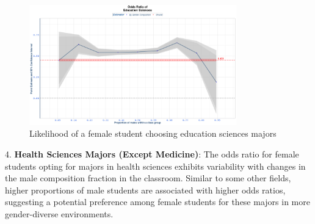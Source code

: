 \begin{figure}[H]
\centering
\includegraphics[width=0.8\textwidth]{Graph/Results/fe_panel_student_gender_composition_wome_in_EDUCATION_SCIENCES_bce.png}
\caption{Likelihood of a female student choosing education sciences majors}
\label{fig:education_sciences}
\end{figure}

4. \textbf{Health Sciences Majors (Except Medicine)}: The odds ratio for female students opting for majors in health sciences exhibits variability with changes in the male composition fraction in the classroom. Similar to some other fields, higher proportions of male students are associated with higher odds ratios, suggesting a potential preference among female students for these majors in more gender-diverse environments.

